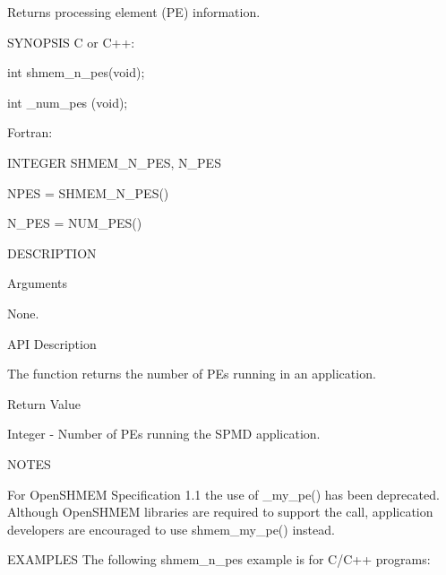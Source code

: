 Returns processing element (PE) information.

SYNOPSIS
       C or C++:

	  int shmem_n_pes(void);
	  
	  int _num_pes (void);

       Fortran:

	  INTEGER SHMEM_N_PES, N_PES

	  NPES = SHMEM_N_PES()
	  
	  N_PES = NUM_PES()

DESCRIPTION

Arguments

       None.

API Description

       The  function  returns	the  number  of	 PEs  running  in   an
       application.

Return Value

	Integer -  Number  of  PEs  running the SPMD application.

NOTES      

       For OpenSHMEM Specification 1.1 the use of _my_pe() has been deprecated. Although OpenSHMEM libraries are required to support the call, application developers are encouraged to use shmem_my_pe() instead.

EXAMPLES
       The following shmem_n_pes example is for C/C++ programs:
      
       

